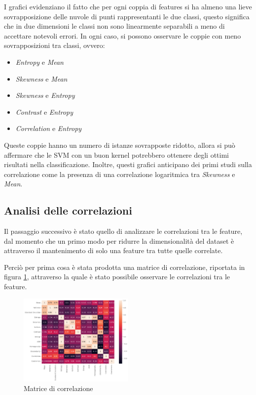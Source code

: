 I grafici evidenziano il fatto che per ogni coppia di features si ha almeno una lieve sovrapposizione
delle nuvole di punti rappresentanti le due classi, questo significa che in due 
dimensioni le classi non sono linearmente separabili a meno di accettare notevoli 
errori. In ogni caso, si possono osservare le coppie con meno sovrapposizioni tra classi,
ovvero:
\begin{itemize}
      \item \textit{Entropy} e \textit{Mean}  
      \item \textit{Skewness} e \textit{Mean}  
      \item \textit{Skewness} e \textit{Entropy}  
      \item \textit{Contrast} e \textit{Entropy}  
      \item \textit{Correlation} e \textit{Entropy}  
\end{itemize} 
Queste coppie hanno un numero di istanze sovrapposte ridotto, allora 
si può affermare che le SVM con un buon kernel potrebbero ottenere degli ottimi 
risultati nella classificazione.
Inoltre, questi grafici anticipano dei primi studi sulla correlazione
come la presenza di una correlazione logaritmica tra \textit{Skewness} e \textit{Mean}.

\subsection{Analisi delle correlazioni} \label{sec:correlazione}
Il passaggio successivo è  stato quello di analizzare le correlazioni tra le feature,
dal momento che un primo modo per ridurre la dimensionalità del dataset è attraverso
il mantenimento di solo una feature tra tutte quelle correlate.

Perciò per prima cosa è stata prodotta una matrice di correlazione, riportata in figura
\ref{fig:corr-matrix}, attraverso la quale è stato possibile osservare le correlazioni
tra le feature.

\begin{figure}[!ht]
      \centering
      \includegraphics[width=0.5\textwidth]{img/analisi/corr.png}
      \caption{Matrice di correlazione}
      \label{fig:corr-matrix}
\end{figure}

